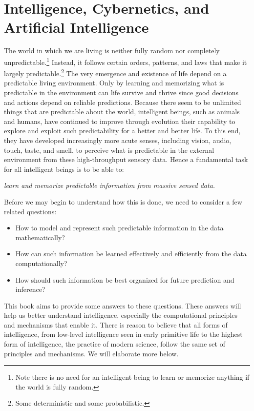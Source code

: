 \documentclass[\toplevelprefix/book-main.tex]{subfiles}
\begin{document}
\section{Intelligence, Cybernetics, and Artificial Intelligence}
The world in which we are living is neither fully random nor completely unpredictable.\footnote{Note there is no need for an intelligent being to learn or memorize anything if the world is fully random.} Instead, it follows certain orders, patterns, and laws that make it largely predictable.\footnote{Some deterministic and some probabilistic.} The very emergence and existence of life depend on a predictable living environment. Only by learning and memorizing what is predictable in the environment can life survive and thrive since good decisions and actions depend on reliable predictions. Because there seem to be unlimited things that are predictable about the world, intelligent beings, such as animals and humans, have continued to improve through evolution their capability to explore and exploit such predictability for a better and better life. To this end, they have developed increasingly more acute senses, including vision, audio, touch, taste, and smell, to perceive what is predictable in the external environment from these high-throughput sensory data. Hence a fundamental task for all intelligent beings is to be able to:
\begin{center}
    {\em learn and memorize predictable information from massive sensed data.}
\end{center}
Before we may begin to understand how this is done, we need to consider a few related questions:
\begin{itemize}
    \item How to model and represent such predictable information in the data mathematically?
    \item How can such information be learned effectively and efficiently from the data computationally?
    \item How should such information be best organized for future prediction and inference?
\end{itemize}
This book aims to provide some answers to these questions. These answers will help us better understand intelligence, especially the computational principles and mechanisms that enable it. There is reason to believe that all forms of intelligence, from low-level intelligence seen in early primitive life to the highest form of intelligence, the practice of modern science, follow the same set of principles and mechanisms. We will elaborate more below.
\end{document}
